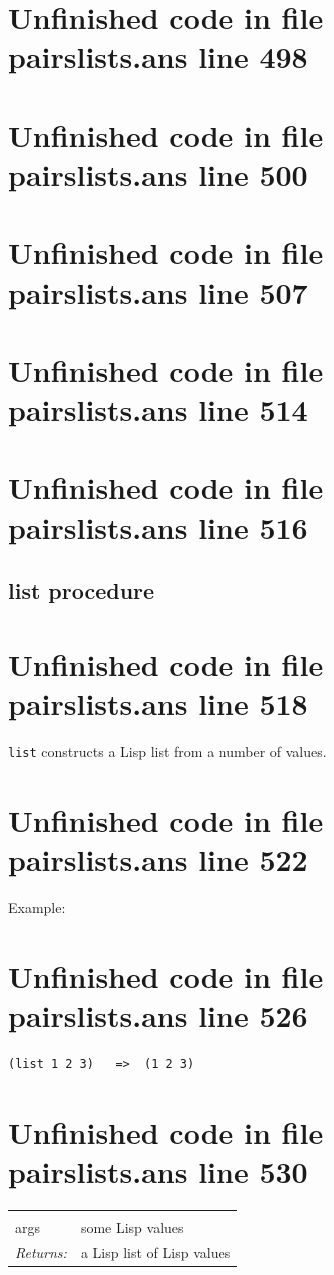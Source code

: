\documentclass[twoside,9pt]{report}
\begin{document}
\section{Unfinished code in file pairslists.ans line 498}
\section{Unfinished code in file pairslists.ans line 500}
\section{Unfinished code in file pairslists.ans line 507}
\section{Unfinished code in file pairslists.ans line 514}
\section{Unfinished code in file pairslists.ans line 516}
\subsection{list procedure}
\label{list-procedure}
\section{Unfinished code in file pairslists.ans line 518}


\texttt{list} constructs a Lisp list from a number of values.

\section{Unfinished code in file pairslists.ans line 522}


Example:

\section{Unfinished code in file pairslists.ans line 526}
\begin{verbatim}
(list 1 2 3)   =>  (1 2 3)
\end{verbatim}
\section{Unfinished code in file pairslists.ans line 530}
\noindent\begin{tabular}{ |p{1.9cm} p{8cm}| }
\hline
\rowcolor[HTML]{CCCCCC} \multicolumn{2}{|l|}{\bf list (public)} \\
args & some Lisp values \\
\textit{Returns:} & a Lisp list of Lisp values \\
\hline
\end{tabular}
\end{document}
